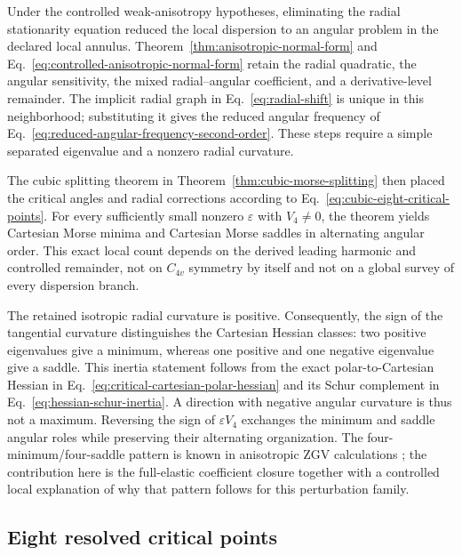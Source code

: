 Under the controlled weak-anisotropy hypotheses, eliminating the radial
stationarity equation reduced the local dispersion to an angular problem in
the declared local annulus.  Theorem~\ref{thm:anisotropic-normal-form} and
Eq.~\eqref{eq:controlled-anisotropic-normal-form} retain the radial quadratic,
the angular sensitivity, the mixed radial--angular coefficient, and a
derivative-level remainder.  The implicit radial graph in
Eq.~\eqref{eq:radial-shift} is unique in this neighborhood; substituting it
gives the reduced angular frequency of
Eq.~\eqref{eq:reduced-angular-frequency-second-order}.  These steps require a
simple separated eigenvalue and a nonzero radial curvature.

The cubic splitting theorem in Theorem~\ref{thm:cubic-morse-splitting} then
placed the critical angles and radial corrections according to
Eq.~\eqref{eq:cubic-eight-critical-points}.
For every sufficiently small nonzero \(\varepsilon\) with \(V_4\ne0\), the
theorem yields
\MorseMinimumCount{} Cartesian Morse minima and \MorseSaddleCount{} Cartesian
Morse saddles in alternating angular order.  This exact local count depends on
the derived leading harmonic and controlled remainder, not on \(C_{4v}\)
symmetry by itself and not on a global survey of every dispersion branch.

The retained isotropic radial curvature is positive.  Consequently, the sign
of the tangential curvature distinguishes the Cartesian Hessian classes: two
positive eigenvalues give a minimum, whereas one positive and one negative
eigenvalue give a saddle.  This inertia statement follows from the exact
polar-to-Cartesian Hessian in Eq.~\eqref{eq:critical-cartesian-polar-hessian}
and its Schur complement in Eq.~\eqref{eq:hessian-schur-inertia}.  A direction
with negative angular curvature is thus not a maximum.  Reversing the sign of
\(\varepsilon V_4\) exchanges the minimum and saddle angular roles while
preserving their alternating organization.  The
four-minimum/four-saddle pattern is known in anisotropic ZGV calculations
\citep{kiefer2023beating,kiefer2025skewing}; the contribution here is the
full-elastic coefficient closure together with a controlled local explanation
of why that pattern follows for this perturbation family.

\subsection{Eight resolved critical points}

